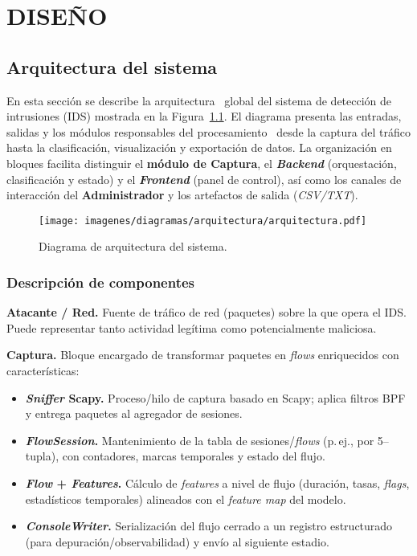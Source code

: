 \chapter{DISEÑO}
\section{Arquitectura del sistema}

En esta sección se describe la arquitectura~\cite{iso42010} global del sistema de detección de intrusiones (IDS) mostrada en la Figura~\ref{fig:Arquitectura2}. El diagrama presenta las entradas, salidas y los módulos responsables del procesamiento~\cite{bass2021sap,kruchten1995} desde la captura del tráfico hasta la clasificación, visualización y exportación de datos. La organización en bloques facilita distinguir el \textbf{módulo de Captura}, el \textbf{\textit{Backend}} (orquestación, clasificación y estado) y el \textbf{\textit{Frontend}} (panel de control), así como los canales de interacción del \textbf{Administrador} y los artefactos de salida (\emph{CSV/TXT}).

\begin{landscape} \begin{figure}[p] \centering \texttt{[image: imagenes/diagramas/arquitectura/arquitectura.pdf]} \caption{Diagrama de arquitectura del sistema.} \label{fig:Arquitectura2} \end{figure} 
\end{landscape}

\subsection*{Descripción de componentes}

\noindent\textbf{Atacante / Red.} Fuente de tráfico de red (paquetes) sobre la que opera el IDS. Puede representar tanto actividad legítima como potencialmente maliciosa.

\noindent\textbf{Captura.} Bloque encargado de transformar paquetes en \emph{flows} enriquecidos con características:
\begin{itemize}
  \item \textbf{\textit{Sniffer} Scapy.} Proceso/hilo de captura basado en Scapy; aplica filtros BPF y entrega paquetes al agregador de sesiones.
  \item \textbf{\textit{FlowSession}.} Mantenimiento de la tabla de sesiones/\textit{flows} (p.\,ej., por 5--tupla), con contadores, marcas temporales y estado del flujo.
  \item \textbf{\textit{Flow} + \textit{Features}.} Cálculo de \emph{features} a nivel de flujo (duración, tasas, \textit{flags}, estadísticos temporales) alineados con el \emph{feature map} del modelo.
  \item \textbf{\textit{ConsoleWriter}.} Serialización del flujo cerrado a un registro estructurado (para depuración/observabilidad) y envío al siguiente estadio.
\end{itemize}

